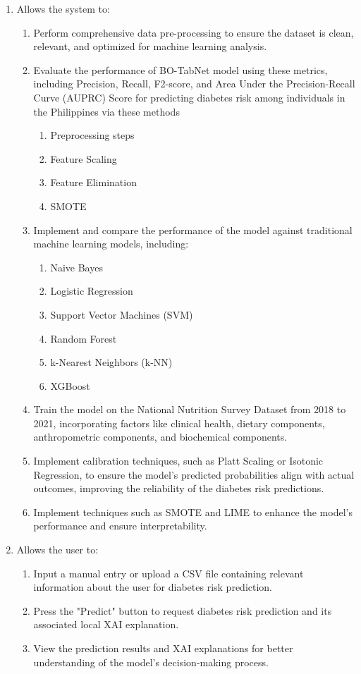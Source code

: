 \documentclass[11pt,a4paper,titlepage]{article}
\begin{document}
\begin{enumerate}
    \item Allows the system to:
    \begin{enumerate}
        \item Perform comprehensive data pre-processing to ensure the dataset is clean, relevant, and optimized for machine learning analysis.
        \item Evaluate the performance of BO-TabNet model using these metrics, including Precision, Recall, F2-score, and Area Under the Precision-Recall Curve (AUPRC) Score for predicting diabetes risk among individuals in the Philippines via these methods
        \begin{enumerate}
            \item Preprocessing steps
            \item Feature Scaling
            \item Feature Elimination
            \item SMOTE
        \end{enumerate}
        \item Implement and compare the performance of the model against traditional machine learning models, including:
        \begin{enumerate}
            \item Naive Bayes
            \item Logistic Regression
            \item Support Vector Machines (SVM)
            \item Random Forest
            \item k-Nearest Neighbors (k-NN)
            \item XGBoost
        \end{enumerate}
        \item Train the model on the National Nutrition Survey Dataset from 2018 to 2021, incorporating factors like clinical health, dietary components, anthropometric components, and biochemical components.
        \item Implement calibration techniques, such as Platt Scaling or Isotonic Regression, to ensure the model’s predicted probabilities align with actual outcomes, improving the reliability of the diabetes risk predictions.
        \item Implement techniques such as SMOTE and LIME to enhance the model’s performance and ensure interpretability.
    \end{enumerate}
    
    \item Allows the user to:
    \begin{enumerate}
        \item Input a manual entry or upload a CSV file containing relevant information about the user for diabetes risk prediction.
        \item Press the "Predict" button to request diabetes risk prediction and its associated local XAI explanation.
        \item View the prediction results and XAI explanations for better understanding of the model’s decision-making process.
    \end{enumerate}
\end{enumerate}
\end{document}
